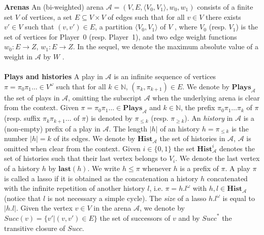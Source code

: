 \textbf{Arenas} An (bi-weighted) arena $\mathcal{A}=(V, E, \langle V_0, V_1 \rangle, w_0, w_1)$ consists of a finite set $V$ of vertices, a set $E \subseteq V \times V$ of edges such that for all $v \in V$ there exists $v' \in V$ such that $(v, v') \in E$, a partition $\langle V_0, V_1 \rangle$ of $V$ , where $V_0$ (resp. $V_1$) is the set of vertices for Player~0 (resp. Player~1), and two edge weight functions $w_0 : E \rightarrow Z$, $w_1 : E \rightarrow Z$. In the sequel, we denote the maximum absolute value of a weight in $\mathcal{A}$ by $W$ .
\\
\\
\noindent\textbf{Plays and histories} A play in $\mathcal{A}$ is an infinite sequence of vertices $ \pi = \pi_0\pi_1 \dots \in V^{\omega}$ such that for all $k \in \mathbb{N}$, $(\pi_k, \pi_{k+1}) \in E$. We denote by $\mathbf{Plays}_{\mathcal{A}}$ the set of plays in $\mathcal{A}$, omitting the subscript $\mathcal{A}$ when the underlying arena is clear from the context. Given $ \pi = \pi_0\pi_1\dots \in \mathbf{Plays}_{\mathcal{A}}$ and $k \in \mathbb{N}$, the prefix $\pi_0\pi_1\dots\pi_k$ of $\pi$ (resp. suffix $\pi_k\pi_{k+1}\dots$ of $\pi$) is denoted by $\pi_{\leqslant k}$ (resp. $\pi_{\geq k}$). An \textit{history} in $\mathcal{A}$ is a (non-empty) prefix of a play in $\mathcal{A}$. The length $|h|$ of an history $h=\pi_{\leqslant k}$ is the number $|h|=k$ of its edges. We denote by $\mathbf{Hist}_{\mathcal{A}}$ the set of histories in $\mathcal{A}$, $\mathcal{A}$ is omitted when clear from the context. Given $i \in \{0,1\}$ the set $\mathbf{Hist}^i_{\mathcal{A}}$ denotes the set of histories such that their last vertex belongs to $V_i$. We denote the last vertex of a history $h$ by $\mathbf{last}(h)$. We write $h\leqslant\pi$ whenever $h$ is a prefix of $\pi$. A play $\pi$ is called a lasso if it is obtained as the concatenation a history $h$ concatenated with the infinite repetition of another history $l$, i.e. $\pi = h.l^{\omega}$ with $h, l \in \mathbf{Hist}_{\mathcal{A}}$ (notice that $l$ is not necessary a simple cycle). The \textit{size} of a lasso $h.l^{\omega}$ is equal to $|h.l|$. Given the vertex $v \in V$ in the arena $\mathcal{A}$, we denote by $\textit{Succ}(v) = \{v' | (v,v') \in E \}$ the set of successors of $v$ and by $\textit{Succ}^*$ the transitive closure of $\textit{Succ}$.
\\
\\
